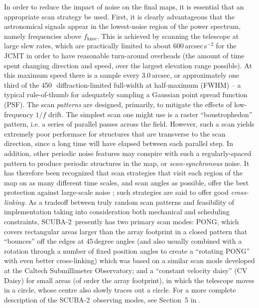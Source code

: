 \documentclass[useAMS,usenatbib,nofootinbib]{mn2e}
\newcommand{\scuba}{SCUBA-2}
\begin{document}
In order to reduce the impact of noise on the final maps, it is
essential that an appropriate scan strategy be used. First, it is
clearly advantageous that the astronomical signals appear in the
lowest-noise region of the power spectrum, namely frequencies above
$f_\mathrm{knee}$. This is achieved by scanning the telescope at large
slew rates, which are practically limited to about
600\,arcsec\,s$^{-2}$ for the JCMT in order to have reasonable
turn-around overheads (the amount of time spent changing direction and
speed, over the largest elevation range possible). At this maximum
speed there is a sample every 3.0\,arcsec, or approximately one third
of the 450\,\micron\ diffraction-limited full-width at half-maximum
(FWHM) -- a typical rule-of-thumb for adequately sampling a Gaussian
point spread function (PSF). The scan \emph{patterns} are designed,
primarily, to mitigate the effects of low-frequency $1/f$ drift. The
simplest scan one might use is a raster ``boustrophedon'' pattern,
i.e. a series of parallel passes across the field. However, such a
scan yields extremely poor performace for structures that are
transverse to the scan direction, since a long time will have elapsed
between each parallel step. In addition, other periodic noise features
may conspire with such a regularly-spaced pattern to produce periodic
structures in the map, or \emph{scan-synchronous} noise.  It has
therefore been recognized that scan strategies that visit each region
of the map on as many different time scales, and scan angles as
possible, offer the best protection against large-scale noise
\citep[see discussion in][and references therein]{kovacs2008b}; such
strategies are said to offer good \emph{cross-linking}. As a tradeoff
between truly random scan patterns and feasibility of implementation
taking into consideration both mechanical and scheduling constraints,
\scuba\ presently has two primary scan modes: PONG, which covers
rectangular areas larger than the array footprint in a closed pattern
that ``bounces'' off the edges at 45\,degree angles (and also usually
combined with a rotation through a number of fixed position angles to
create a ``rotating PONG'' with even better cross-linking) which was
based on a similar scan mode developed at the Caltech Submillimeter
Observatory; and a ``constant velocity daisy'' (CV Daisy) for small
areas (of order the array footprint), in which the telescope moves in
a circle, whose centre also slowly traces out a circle. For a more
complete description of the \scuba\ observing modes, see Section~5 in
\citet{holland2012}.
\end{document}
